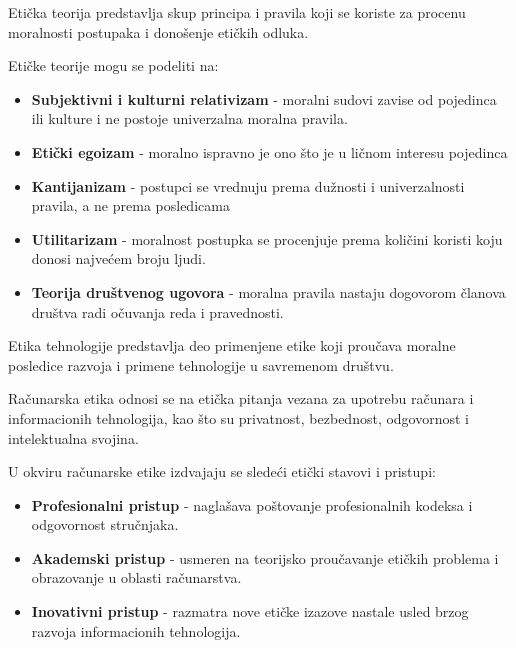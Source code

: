 \documentclass[a4paper, 12pt]{article}
\begin{document}
Etička teorija predstavlja skup principa i pravila koji se koriste za procenu
moralnosti postupaka i donošenje etičkih odluka.

Etičke teorije mogu se podeliti na:
\begin{itemize}
    \item \textbf{Subjektivni i kulturni relativizam} - moralni sudovi zavise od
    pojedinca ili kulture i ne postoje univerzalna moralna pravila.
    \item \textbf{Etički egoizam} - moralno ispravno je ono što je u ličnom interesu
    pojedinca
    \item \textbf{Kantijanizam} - postupci se vrednuju prema dužnosti i univerzalnosti
    pravila, a ne prema posledicama
    \item \textbf{Utilitarizam} - moralnost postupka se procenjuje prema količini koristi
    koju donosi najvećem broju ljudi.
    \item \textbf{Teorija društvenog ugovora} - moralna pravila nastaju dogovorom članova
    društva radi očuvanja reda i pravednosti.
\end{itemize}

Etika tehnologije predstavlja deo primenjene etike koji proučava moralne
posledice razvoja i primene tehnologije u savremenom društvu.

Računarska etika odnosi se na etička pitanja vezana za upotrebu računara i
informacionih tehnologija, kao što su privatnost, bezbednost, odgovornost i
intelektualna svojina.

U okviru računarske etike izdvajaju se sledeći etički stavovi i pristupi:
\begin{itemize}
    \item \textbf{Profesionalni pristup} - naglašava poštovanje profesionalnih kodeksa i
    odgovornost stručnjaka.
    \item \textbf{Akademski pristup} - usmeren na teorijsko proučavanje etičkih problema i
    obrazovanje u oblasti računarstva.
    \item \textbf{Inovativni pristup} - razmatra nove etičke izazove nastale usled brzog
    razvoja informacionih tehnologija.
\end{itemize}
\end{document}
